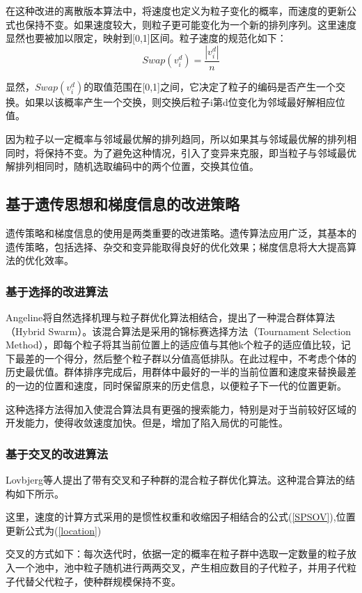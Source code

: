 在这种改进的离散版本算法中，将速度也定义为粒子变化的概率，而速度的更新公式也保持不变。如果速度较大，则粒子更可能变化为一个新的排列序列。这里速度显然也要被加以限定，映射到[0,1]区间。粒子速度的规范化如下：
\begin{equation}
Swap(v_i^d)=\frac{|v_i^d|}{n}
\end{equation}

显然，$Swap(v_i^d)$的取值范围在[0,1]之间，它决定了粒子的编码是否产生一个交换。如果以该概率产生一个交换，则交换后粒子i第d位变化为邻域最好解相应位值。

因为粒子以一定概率与邻域最优解的排列趋同，所以如果其与邻域最优解的排列相同时，将保持不变。为了避免这种情况，引入了变异来克服，即当粒子与邻域最优解排列相同时，随机选取编码中的两个位置，交换其位值。
\subsection{基于遗传思想和梯度信息的改进策略}
遗传策略和梯度信息的使用是两类重要的改进策略。遗传算法应用广泛，其基本的遗传策略，包括选择、杂交和变异能取得良好的优化效果；梯度信息将大大提高算法的优化效率。
\subsubsection{基于选择的改进算法}
Angeline将自然选择机理与粒子群优化算法相结合，提出了一种混合群体算法（Hybrid Swarm）。该混合算法是采用的锦标赛选择方法（Tournament Selection Method），即每个粒子将其当前位置上的适应值与其他k个粒子的适应值比较，记下最差的一个得分，然后整个粒子群以分值高低排队。在此过程中，不考虑个体的历史最优值。群体排序完成后，用群体中最好的一半的当前位置和速度来替换最差的一边的位置和速度，同时保留原来的历史信息，以便粒子下一代的位置更新。

这种选择方法得加入使混合算法具有更强的搜索能力，特别是对于当前较好区域的开发能力，使得收敛速度加快。但是，增加了陷入局优的可能性。

\subsubsection{基于交叉的改进算法}
Lovbjerg等人提出了带有交叉和子种群的混合粒子群优化算法。这种混合算法的结构如下所示。

这里，速度的计算方式采用的是惯性权重和收缩因子相结合的公式(\ref{SPSOV}),位置更新公式为(\ref{location})

交叉的方式如下：每次迭代时，依据一定的概率在粒子群中选取一定数量的粒子放入一个池中，池中粒子随机进行两两交叉，产生相应数目的子代粒子，并用子代粒子代替父代粒子，使种群规模保持不变。

